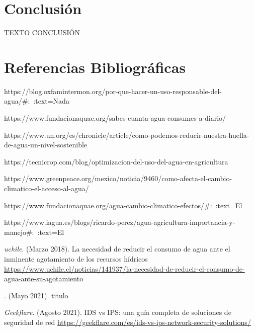 \documentclass[12pt,letterpaper]{article}
\begin{document}
\newpage
\section{Conclusión}

TEXTO CONCLUSIÓN

\newpage

\section{Referencias Bibliográficas}
\begin{thebibliography}{0}
    

https://blog.oxfamintermon.org/por-que-hacer-un-uso-responsable-del-agua/#:~:text=Nada%

https://www.fundacionaquae.org/sabes-cuanta-agua-consumes-a-diario/

https://www.un.org/es/chronicle/article/como-podemos-reducir-nuestra-huella-de-agua-un-nivel-sostenible

https://tecnicrop.com/blog/optimizacion-del-uso-del-agua-en-agricultura

https://www.greenpeace.org/mexico/noticia/9460/como-afecta-el-cambio-climatico-el-acceso-al-agua/

https://www.fundacionaquae.org/agua-cambio-climatico-efectos/#:~:text=El%

https://www.iagua.es/blogs/ricardo-perez/agua-agricultura-importancia-y-manejo#:~:text=El%

    
    \textit{uchile}. (Marzo 2018). La necesidad de reducir el consumo de agua ante el inminente agotamiento de los recursos hídricos
    \url{https://www.uchile.cl/noticias/141937/la-necesidad-de-reducir-el-consumo-de-agua-ante-su-agotamiento}
    
    
    \bibitem{}
    \textit{}. (Mayo 2021). titulo
    \url{}
        

    \textit{Geekflare}. (Agosto 2021). IDS vs IPS: una guía completa de soluciones de seguridad de red
    \url{https://geekflare.com/es/ids-vs-ips-network-security-solutions/}
    
        
\end{thebibliography}
\end{document}

